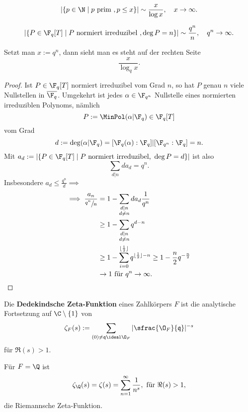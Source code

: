 \begin{theorem}[Primzahlsatz]
    $$ |\{p \in \N \mid p \text{ prim }, p \leq x\}| \sim \frac{x}{\log x},\quad x \to \infty.$$
\end{theorem}

\begin{theorem}[Primpolynomsatz]
    $$|\{P \in \F_q[T] \mid P \text{ normiert irreduzibel }, \deg P = n\}| \sim \frac{q^n}{n},\quad q^n \to \infty.$$
\end{theorem}

\begin{bemerkungnr}
    Setzt man $x := q^n$, dann sieht man es steht auf der rechten Seite $$ \frac{x}{\log_q x}.$$
\end{bemerkungnr}
\begin{proof}
    Ist $P \in \F_q[T]$ normiert irreduzibel vom Grad $n$, so hat $P$ genau $n$ viele Nullstellen in $\overline{\F_q}$.
    Umgekehrt ist jedes $\alpha \in \F_{q^n}$ Nullstelle eines normierten irreduziblen Polynoms, nämlich
    $$ P := \MinPol(\alpha|\F_q) \in \F_q[T]$$
    vom Grad
    $$ d := \deg (\alpha|\F_q) = [\F_q(\alpha): \F_q]|[\F_{q^n}:\F_q] = n.$$
    Mit $a_d := |\{P \in \F_q[T] \mid P \text{ normiert irreduzibel, } \deg P = d\}|$ ist also
    $$ \sum_{d|n}d a_d = q^n .$$
    Insbesondere $a_d \leq \frac{q^n}{d} \implies$
    \begin{align*}
        \implies \frac{a_n}{\sfrac{q^n}{n}} & = 1 - \sum_{\substack{d|n\\ d\ne n}} d a_d \frac{1}{q^n}\\
        & \geq 1 - \sum_{\substack{d|n\\ d\ne n}} q^{d-n}\\
        & \geq 1 - \sum_{i=0}^{\lfloor\frac{1}{2}\rfloor} q^{\lfloor\frac{1}{2}\rfloor-n} \geq 1 - \frac{n}{2}q^{-\frac{n}{2}}\\
        & \to 1 \text{ für }q^n \to \infty.
    \end{align*}
\end{proof}

\begin{definition}
    Die \textbf{Dedekindsche Zeta-Funktion} eines Zahlkörpers $F$ ist die analytische Fortsetzung auf $\C \setminus \{1\}$
    von
    $$ \zeta_F(s) := \sum_{(0) \ne \mathfrak{q}\ideal \O_F} | \sfrac{\O_F}{\mathfrak{q}}|^{-s}$$
    für $\Re(s) > 1$.
\end{definition}

\begin{beispiel}
    Für $F=\Q$ ist
    $$ \zeta_\Q(s) = \zeta(s) = \sum_{n=1}^\infty \frac{1}{n^s}, \text{ für } \Re(s) > 1,$$
    die Riemannsche Zeta-Funktion.
\end{beispiel}

